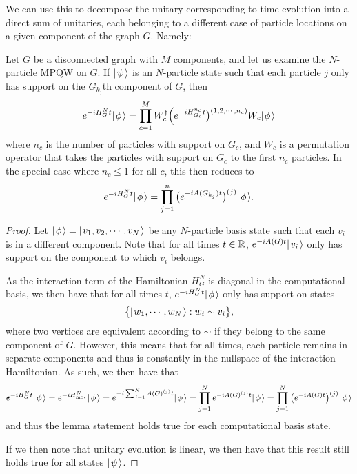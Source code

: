 \documentclass[../thesis-main/thesis-main]{subfiles}
\begin{document}
We can use this to decompose the unitary corresponding to time evolution into a direct sum of unitaries, each belonging to a different case of particle locations on a given component of the graph $G$.  Namely:
\begin{lemma}
  Let $G$ be a disconnected graph with $M$ components, and let us examine the $N$-particle MPQW on $G$.  If $|\mspace{2mu} \psi \mspace{2mu} \rangle$ is an $N$-particle state such that each particle $j$ only has support on the $G_{k_j}$th component of $G$, then 
  \begin{align}
    e^{-i H_G^N t} |\mspace{2mu} \phi \mspace{2mu} \rangle = \prod_{c=1}^M W_{c}^\dag \Big(e^{- i H_{G_c}^{n_c} t } \big)^{(1,2,\cdots,n_c)} W_{c} |\mspace{2mu} \phi \mspace{2mu} \rangle
  \end{align}
  where $n_c$ is the number of particles with support on $G_c$, and $W_c$ is a permutation operator that takes the particles with support on $G_c$ to the first $n_c$ particles.  In the special case where $n_c \leq 1$ for all $c$, this then reduces to
  \begin{align}
    e^{-i H_G^N t} |\mspace{2mu} \phi \mspace{2mu} \rangle = \prod_{j=1}^n \big( e^{-i A(G_{k_j}) t}\big)^{(j)} |\mspace{2mu} \phi \mspace{2mu} \rangle.
  \end{align}
\label{lem:disconnected_MPQW}
\end{lemma}
\begin{proof}
  Let $|\mspace{2mu} \phi \mspace{2mu} \rangle = |\mspace{2mu} v_1,v_2,\cdots , v_N \mspace{2mu} \rangle$ be any $N$-particle basis state such that each $v_i$ is in a different component.  Note that for all times $t\in \mathbb{R}$, $e^{-i A(G) t} |\mspace{2mu} v_i \mspace{2mu} \rangle$ only has support on the component to which $v_i$ belongs. 
  
  As the interaction term of the Hamiltonian $H_G^N$ is diagonal in the computational basis, we then have that for all times $t$, $e^{-i H_G^N t} |\mspace{2mu} \phi \mspace{2mu} \rangle$ only has support on states 
  \begin{align}
    \big\{ |\mspace{2mu} w_1,\cdots, w_N \mspace{2mu} \rangle : w_i \sim v_i \big\},
  \end{align}
  where two vertices are equivalent according to $\sim$ if they belong to the same component of $G$.  However, this means that for all times, each particle remains in separate components and thus is constantly in the nullspace of the interaction Hamiltonian.  As such, we then have that
  \begin{align}
    e^{-i H_G^N t} |\mspace{2mu} \phi \mspace{2mu} \rangle = e^{- i H_\text{mov}^N} |\mspace{2mu} \phi \mspace{2mu} \rangle = e^{-i \sum_{j=1}^N A(G)^{(j)} t} |\mspace{2mu} \phi \mspace{2mu} \rangle = \prod_{j=1}^N e^{-i A(G)^{(j)} t} |\mspace{2mu} \phi \mspace{2mu} \rangle = \prod_{j=1}^N \big(e^{- i A(G) t} \big)^{(j)} |\mspace{2mu} \phi \mspace{2mu} \rangle
  \end{align}
  and thus the lemma statement holds true for each computational basis state.
  
  If we then note that unitary evolution is linear, we then have that this result still holds true for all states $|\mspace{2mu} \psi \mspace{2mu} \rangle$.
\end{proof}
\end{document}

